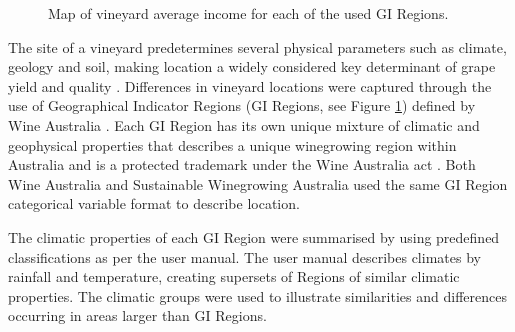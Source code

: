 \documentclass[review,12pt,authoryear]{elsarticle}
\begin{document}
\begin{linenumbers}
\begin{figure}
  \caption{Map of vineyard average income for each of the used GI Regions.}\label{fig:map}
\end{figure}%

\par
The site of a vineyard predetermines several physical parameters such as climate, geology and soil, making location a widely considered key determinant of grape yield and quality \citep{abbalDecisionSupportSystem2016,agostaRegionalClimateVariability2012,fragaMultivariateClusteringViticultural2017}. Differences in vineyard locations were captured through the use of Geographical Indicator Regions (GI Regions, see Figure \ref{fig:map}) defined by Wine Australia \citep{hallidayAustralianWineEncyclopedia2009,oliverReviewSoilPhysical2013,soarClimateDriversRed2008}. Each GI Region has its own unique mixture of climatic and geophysical properties that describes a unique winegrowing region within Australia and is a protected trademark under the Wine Australia act \citet{WineAustraliaAct2019}. Both Wine Australia and Sustainable Winegrowing Australia used the same GI Region categorical variable format to describe location.
\par
 The climatic properties of each GI Region were summarised by using predefined classifications as per the \citet{sustainablewinegrowingaustraliaSustainableWinegrowingAustralia2021} user manual. The user manual describes climates by rainfall and temperature, creating supersets of Regions of similar climatic properties. The climatic groups were used to illustrate similarities and differences occurring in areas larger than GI Regions.
\par

\end{linenumbers}
\end{document}
